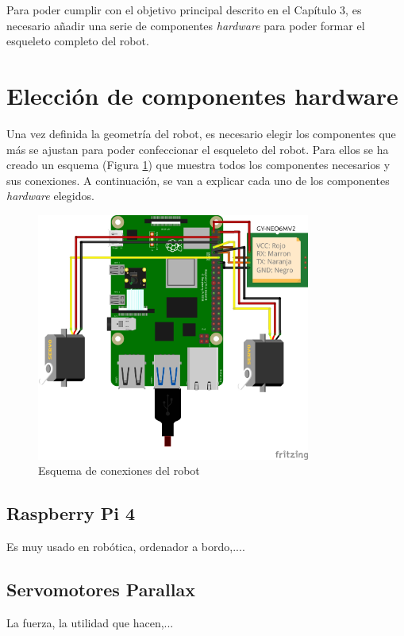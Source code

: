 Para poder cumplir con el objetivo principal descrito en el Capítulo 3, es necesario añadir una serie de componentes \textit{hardware} para poder formar el esqueleto completo del robot.

\section{Elección de componentes hardware}

Una vez definida la geometría del robot, es necesario elegir los componentes que más se ajustan para poder confeccionar el esqueleto del robot. Para ellos se ha creado un esquema (Figura \ref{fig:fritzzing}) que muestra todos los componentes necesarios y sus conexiones. A continuación, se van a explicar cada uno de los componentes \textit{hardware} elegidos.  

\begin{figure} [h!]
	\begin{center}
		\includegraphics[width=9cm]{figs/cap5/modelocompleto_bb.jpg}
	\end{center}
	\caption{Esquema de conexiones del robot} 
	\label{fig:fritzzing}
\end{figure}


\subsection{Raspberry Pi 4}

Es muy usado en robótica, ordenador a bordo,....



\subsection{Servomotores Parallax}
La fuerza, la utilidad que hacen,...



